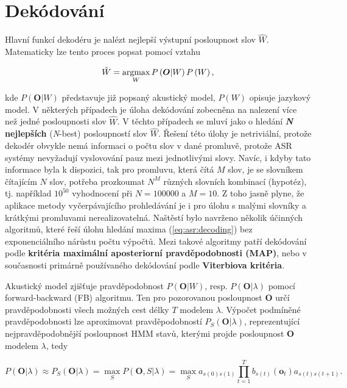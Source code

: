 \section{Dekódování}
\label{chap:asr:decoding}

Hlavní funkcí dekodéru je nalézt nejlepší výstupní posloupnost slov $\hat{W}$. Matematicky lze tento proces popsat pomocí vztahu

\begin{equation}
  \hat{W} = \operatorname*{argmax}_{W} P\left(\boldsymbol{O} | W\right)P\left(W\right),
  \label{eq:asr:decoding:decoder}
\end{equation}

\noindent kde $P\left(\boldsymbol{O}|W\right)$ představuje již popsaný akustický model, $P\left(W\right)$ opisuje jazykový model. V některých případech je úloha dekódování zobecněna na nalezení více než jedné posloupnosti slov $\hat{W}$. V těchto případech se mluví jako o hledání \textbf{\textit{N} nejlepších} (\textit{N}-best) posloupností slov $\hat{W}$.  Řešení této úlohy je netriviální, protože dekodér obvykle nemá informaci o počtu slov v dané promluvě, protože ASR systémy nevyžadují vyslovování pauz mezi jednotlivými slovy. Navíc, i kdyby tato informace byla k dispozici, tak pro promluvu, která čítá $M$ slov, je se slovníkem čítajícím $N$ slov, potřeba prozkoumat $N^{M}$ různých slovních kombinací (hypotéz), tj. například $10^{50}$ vyhodnocení při $N=100000$ a $M=10$. Z toho jasně plyne, že aplikace metody vyčerpávajícího prohledávání je i pro úlohu s malými slovníky a krátkými promluvami nerealizovatelná.
Naštěstí bylo navrženo několik účinných algoritmů, které řeší úlohu hledání maxima (\ref{eq:asr:decoding}) bez exponenciálního nárůstu počtu výpočtů. Mezi takové algoritmy patří dekódování podle \textbf{kritéria maximální aposteriorní pravděpodobnosti (MAP)}, nebo v současnosti primárně používaného dekódování podle \textbf{Viterbiova kritéria}.

Akustický model zjišťuje pravděpodobnost $P\left(\boldsymbol{O}|W\right)$, resp. $P\left(\boldsymbol{O}|\lambda\right)$ pomocí forward-backward (FB) algoritmu.
Ten pro pozorovanou posloupnost $\boldsymbol{O}$ určí pravděpodobnosti všech možných cest délky $T$ modelem $\lambda$.
Výpočet podmíněné pravděpodobnosti lze aproximovat pravděpodobností $P_S(\boldsymbol{O}|\lambda)$, reprezentující nejpravděpodobnější posloupnost HMM stavů, kterými projde posloupnost $\boldsymbol{O}$ modelem $\lambda$, tedy

\begin{equation}
  P\left(\boldsymbol{O}|\lambda\right) \approx P_S\left(\boldsymbol{O}|\lambda\right) = \max_S P\left(\boldsymbol{O}, S| \lambda \right) = \max_S a_{s\left(0\right)s\left(1\right)} \prod_{t=1}^{T} b_{s\left(t\right)}\left(\boldsymbol{o}_t\right) a_{s\left(t\right)s\left(t+1\right)}.
  \label{eq:asr:decoding:approx}
\end{equation}

